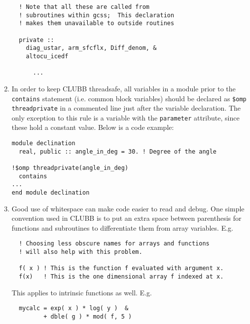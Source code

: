 \documentclass[letterpaper,12pt]{article}
\begin{document}
\begin{enumerate}
\begin{verbatim}
  ! Note that all these are called from 
  ! subroutines within gcss;  This declaration
  ! makes them unavailable to outside routines

  private ::
    diag_ustar, arm_sfcflx, Diff_denom, &
    altocu_icedf

      ...

\end{verbatim}

\item In order to keep CLUBB threadsafe, all variables in a module prior to the \texttt{contains}
statement (i.e. common block variables) should be declared as \texttt{\$omp threadprivate} in
a commented line just after the variable declaration.  The only exception to this rule is a 
variable with the \texttt{parameter} attribute, since these hold a constant value.  Below is a code example: \\
\begin{verbatim}
module declination
  real, public :: angle_in_deg = 30. ! Degree of the angle

!$omp threadprivate(angle_in_deg)
  contains
...
end module declination
\end{verbatim}

\item Good use of whitespace can make code easier to read and debug.  
One simple convention used in CLUBB is to put an extra space between 
parenthesis for functions and subroutines to differentiate them from 
array variables. \newline
E.g.
\begin{verbatim}
  ! Choosing less obscure names for arrays and functions 
  ! will also help with this problem.

  f( x ) ! This is the function f evaluated with argument x.
  f(x)   ! This is the one dimensional array f indexed at x.
\end{verbatim}

This applies to intrinsic functions as well. \newline
E.g.
\begin{verbatim}
  mycalc = exp( x ) * log( y )  &
         + dble( g ) * mod( f, 5 )
\end{verbatim}

%
%


\end{enumerate}
\end{document}
